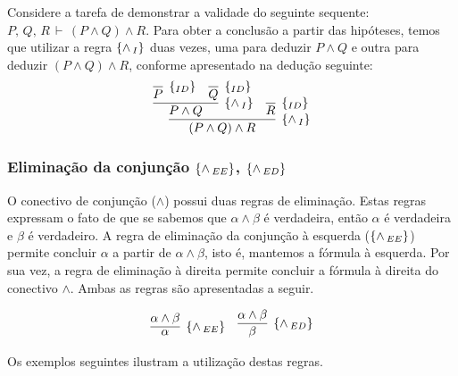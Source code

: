 \begin{Example}
   Considere a tarefa de demonstrar a validade do seguinte sequente:
   $P,\,Q,\,R\,\vdash\,(P\land Q)\land R$. Para obter a conclus\~ao a
   partir das hip\'oteses, temos que utilizar a regra $\scriptsize{\{\land\,_I\}}$ duas
   vezes, uma para deduzir $P \land Q$ e outra para deduzir $(P\land
   Q)\land R$, conforme apresentado na dedu\c{c}\~ao seguinte:
  \[
      \infer[\andI]
               {(P\land Q)\land R}
               {
                   \infer[\andI]
                            {P\land Q}
                            {
                              \infer[\Id]
                                       {P}{}
                               &
                               \infer[\Id]
                                        {Q}{}
                            }
                    &
                    \infer[\Id]
                            {R}{}
               }
  \]
\end{Example}

\subsubsection{Elimina\c{c}\~ao da conjun\c{c}\~ao  $\scriptsize{\{\land\,_{EE}\}}$,
  $\scriptsize{\{\land\,_{ED}\}}$}

O conectivo de conjun\c{c}\~ao ($\land$) possui duas regras de
elimina\c{c}\~ao. Estas regras expressam o fato de que se sabemos que
$\alpha \land \beta$ \'e verdadeira, ent\~ao $\alpha$ \'e verdadeira e
$\beta$ \'e verdadeiro. A regra de elimina\c{c}\~ao da conjun\c{c}\~ao
\`a esquerda ($\scriptsize{\{\land\,_{EE}\}}$) permite concluir $\alpha$ a partir de
$\alpha\land \beta$, isto \'e, mantemos a f\'ormula \`a esquerda. Por
sua vez, a regra de elimina\c{c}\~ao \`a direita permite concluir a
f\'ormula \`a direita do conectivo $\land$. Ambas as regras s\~ao
apresentadas a seguir.

\[
\begin{array}{cc}
     \infer[\andEE]
              {\alpha}
              {\alpha \land \beta}
      &
     \infer[\andED]
              {\beta}
              {\alpha \land \beta}
\end{array}
\]

Os exemplos seguintes ilustram a utiliza\c{c}\~ao destas regras.

